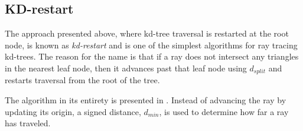\begin{figure}
{
    \label{fig:simpleTree}
  }
  \caption[A simple scene and its kd-tree.]{}
  \label{fig:simpleSceneTree}
\end{figure}


\subsection{KD-restart}\label{sec:kdRestart}


The approach presented above, where kd-tree traversal is restarted at the root
node, is known as \textit{kd-restart} and is one of the simplest algorithms for
ray tracing kd-trees. The reason for the name is that if a ray does not
intersect any triangles in the nearest leaf node, then it advances past that
leaf node using $d_{split}$ and restarts traversal from the root of the tree.


The algorithm in its entirety is presented in . Instead of
advancing the ray by updating its origin, a signed distance, $d_{min}$, is used
to determine how far a ray has traveled.


